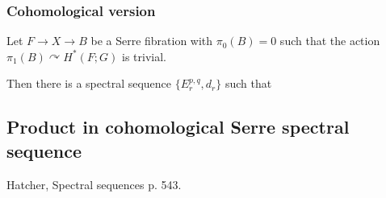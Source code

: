 \begin{remark}
\begin{definition}
\subsubsection{Cohomological version}

\begin{thm}
	Let $F\to X\to B$ be a Serre fibration with $\pi_0(B)=0$ such that the action $\pi_1(B)\curvearrowright H^*(F;G)$ is trivial.

	Then there is a spectral sequence $\{E_r^{p,q},d_r\}$ such that
\begin{itemize}
	\item $$d_r:E_r^{p,q}\to E_r^{p+r,q-r+1}\qquad\textand} \qquad  E_{r+1}^{p,q}=\ker d_r/\img d_r.$$
	\item The groups
		$$F^pH^n:=\img (F^pH^n\to F^nH^n=H^n(X))$$
	form a filtration
	$$H^{n}(X)=F^0H^n\supset F^1H^n\supset \ldots\supset F^nH^n\supset \varnothing $$

	of $H^{n}(X,G)$ such that
	$$E_{\infty}^{p,q}\cong F^pH^{p+q}/F^{p+1}H^{p+q}.$$
\item $$E^{p,q}_2\cong H^p(B,H^{q}(F,G)).$$
\end{itemize}
\end{thm}

\subsection{Product in cohomological Serre spectral sequence}
Hatcher, Spectral sequences p. 543.


\end{definition}
\end{remark}
